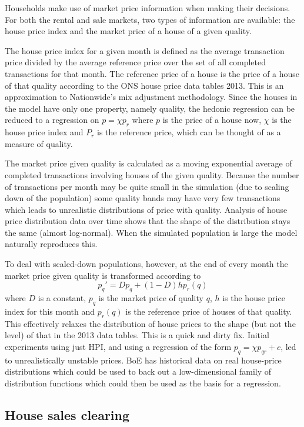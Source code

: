 \documentclass{report}
\begin{document}
Households make use of market price information when making their decisions. For both the rental and sale markets, two types of information are available: the house price index and the market price of a house of a given quality.

The house price index for a given month is defined as the average transaction price divided by the average reference price over the set of all completed transactions for that month. The reference price of a house is the price of a house of that quality according to the ONS house price data tables 2013. This is an approximation to Nationwide's mix adjustment methodology. Since the houses in the model have only one property, namely quality, the hedonic regression can be reduced to a regression on $p = \chi p_{r}$ where $p$ is the price of a house now, $\chi$ is the house price index and $P_{r}$ is the reference price, which can be thought of as a measure of quality.

The market price given quality is calculated as a moving exponential average of completed transactions involving houses of the given quality. Because the number of transactions per month may be quite small in the simulation (due to scaling down of the population) some quality bands may have very few transactions which leads to unrealistic distributions of price with quality. Analysis of house price distribution data over time shows that the shape of the distribution stays the same (almost log-normal). When the simulated population is large the model naturally reproduces this.

To deal with scaled-down populations, however, at the end of every month the market price given quality is transformed according to
\[
p_q' = Dp_q + (1-D)hp_r(q)
\]
where $D$ is a constant, $p_q$ is the market price of quality $q$, $h$ is the house price index for this month and $p_r(q)$ is the reference price of houses of that quality. This effectively relaxes the distribution of house prices to the shape (but not the level) of that in the 2013 data tables. This is a quick and dirty fix. Initial experiments using just HPI, and using a regression of the form $p_q = \chi p_{qr} + c$, led to unrealistically unstable prices. BoE has historical data on real house-price distributions which could be used to back out a low-dimensional family of distribution functions which could then be used as the basis for a regression.

\subsection{House sales clearing}
\end{document}
